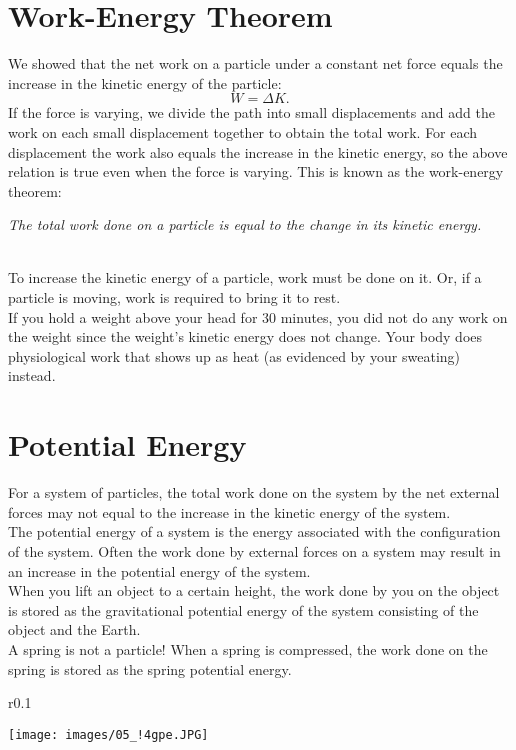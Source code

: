 \documentclass[11pt,a4paper]{report}
\begin{document}
\section{Work-Energy Theorem}
We showed that the net work on a particle under a constant net force equals the increase in the kinetic energy of the particle: $$W = \Delta{K}.$$
If the force is varying, we divide the path into small displacements and add the work on each small displacement together to obtain the total work. For each displacement the work also equals the increase in the kinetic energy, so the above relation is true even when the force is varying. This is known as the work-energy theorem:\\\centerline{\emph{The total work done on a particle is equal to the change in its kinetic energy.}}
\\To increase the kinetic energy of a particle, work must be done on it. Or, if a particle is moving, work is required to bring it to rest.
\\If you hold a weight above your head for 30 minutes, you did not do any work on the weight since the weight's kinetic energy does not change. Your body does physiological work that shows up as heat (as evidenced by your sweating) instead.

\section{Potential Energy}
For a system of particles, the total work done on the system by the net external forces may not equal to the increase in the kinetic energy of the system.
\\The potential energy of a system is the energy associated with the configuration of the system. Often the work done by external forces on a system may result in an increase in the potential energy of the system.
\\When you lift an object to a certain height, the work done by you on the object is stored as the gravitational potential energy of the system consisting of the object and the Earth.
\\A spring is not a particle! When a spring is compressed, the work done on the spring is stored as the spring potential energy.

\begin{wrapfigure}{r}{0.1\textwidth}
\vspace{-23pt}
\begin{center}
\texttt{[image: images/05\_!4gpe.JPG]}
\end{center}
\end{wrapfigure}
\end{document}
